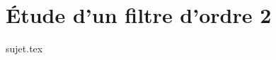 \documentclass[a4paper, 10pt, garamond]{book}
\begin{document}
\chapter{Étude d'un filtre d'ordre 2}
\resetQ
{sujet.tex}
\end{document}
